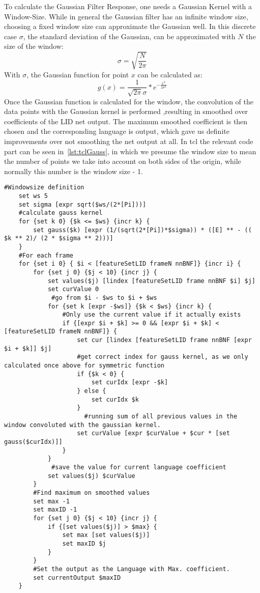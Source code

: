 To calculate the Gaussian Filter Response, one needs a Gaussian Kernel with a Window-Size. While in general the Gaussian filter has an infinite window size, choosing a fixed window size can approximate the Gaussian well. In this discrete case \(\sigma\), the standard deviation of the Gaussian, can be approximated with \(N\) the size of the window:
\begin{equation}
\sigma  =\sqrt{\frac{N}{2\pi}}
\end{equation}
With \(\sigma\), the Gaussian function for point \(x\) can be calculated as:
\begin{equation}
g(x) = \frac{1}{\sqrt{2\pi}\sigma} * e^{{- \frac{x^2}{2\sigma^2}}}
\end{equation}
Once the Gaussian function is calculated for the window, the convolution of the data points with the Gaussian kernel is performed ,resulting in smoothed over coefficients of the LID net output. The maximum smoothed coefficient is then chosen and the corresponding language is output, which gave us definite improvements over not smoothing the net output at all. In tcl the relevant code part can be seen in~\ref{lst:tclGauss}, in which we presume the window size to mean the number of points we take into account on both sides of the origin, while normally this number is the window size - 1.
\begin{lstlisting}[label=lst:tclGauss,caption=Gaussian Smoothing Filter as implemented in tcl/tk for the jrtk]
    #Windowsize definition
    set ws 5
    set sigma [expr sqrt($ws/(2*[Pi]))]
    #calculate gauss kernel
    for {set k 0} {$k <= $ws} {incr k} {
        set gauss($k) [expr (1/(sqrt(2*[Pi])*$sigma)) * ([E] ** - (( $k ** 2)/ (2 * $sigma ** 2)))]
    }
    #For each frame
    for {set i 0} { $i < [featureSetLID frameN nnBNF]} {incr i} {
        for {set j 0} {$j < 10} {incr j} {
            set values($j) [lindex [featureSetLID frame nnBNF $i] $j]
            set curValue 0
	         #go from $i - $ws to $i + $ws
            for {set k [expr -$ws]} {$k < $ws} {incr k} {
                #Only use the current value if it actually exists
                if {[expr $i + $k] >= 0 && [expr $i + $k] < [featureSetLID frameN nnBNF]} {
                    set cur [lindex [featureSetLID frame nnBNF [expr $i + $k]] $j]
                    #get correct index for gauss kernel, as we only calculated once above for symmetric function
                    if {$k < 0} {
                        set curIdx [expr -$k]
                    } else {
                        set curIdx $k
                    }
		              #running sum of all previous values in the window convoluted with the gaussian kernel.
                    set curValue [expr $curValue + $cur * [set gauss($curIdx)]]
                }
            }
	         #save the value for current language coefficient
            set values($j) $curValue
        }
        #Find maximum on smoothed values
        set max -1
        set maxID -1
        for {set j 0} {$j < 10} {incr j} {
            if {[set values($j)] > $max} {
                set max [set values($j)]
                set maxID $j
            }
        }
        #Set the output as the Language with Max. coefficient.
        set currentOutput $maxID
    }
\end{lstlisting}


